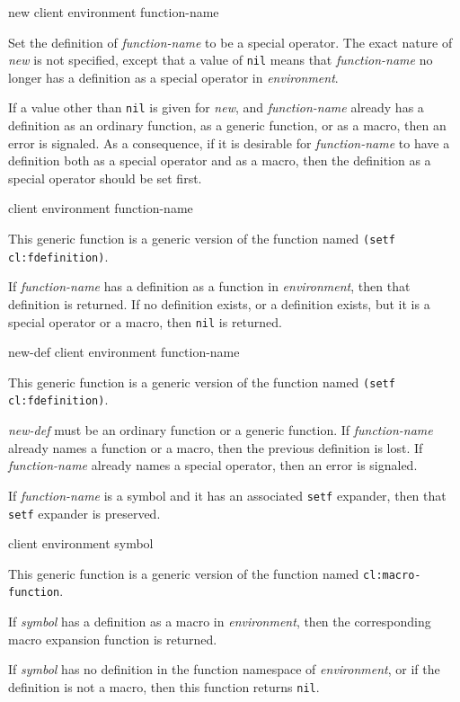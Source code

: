  {new client environment function-name}

Set the definition of \textit{function-name} to be a special operator.
The exact nature of \textit{new} is not specified, except that a
value of \texttt{nil} means that \textit{function-name} no longer has
a definition as a special operator in \textit{environment}.

If a value other than \texttt{nil} is given for \textit{new}, and
\textit{function-name} already has a definition as an ordinary
function, as a generic function, or as a macro, then an error is
signaled.  As a consequence, if it is desirable for
\textit{function-name} to have a definition both as a special operator
and as a macro, then the definition as a special operator should be
set first.

 {client environment function-name}

This generic function is a generic version of the \commonlisp{}
function named \texttt{(setf cl:fdefinition)}.

If \textit{function-name} has a definition as a function in
\textit{environment}, then that definition is returned.  If no
definition exists, or a definition exists, but it is a special
operator or a macro, then \texttt{nil} is returned.

 {new-def client environment function-name}

This generic function is a generic version of the \commonlisp{}
function named \texttt{(setf cl:fdefinition)}.

\textit{new-def} must be an ordinary function or a generic function.
If \textit{function-name} already names a function or a macro, then
the previous definition is lost.  If \textit{function-name} already
names a special operator, then an error is signaled.

If \textit{function-name} is a symbol and it has an associated \texttt{setf}
expander, then that \texttt{setf} expander is preserved.

 {client environment symbol}

This generic function is a generic version of the \commonlisp{}
function named \texttt{cl:macro-function}.

If \textit{symbol} has a definition as a macro in
\textit{environment}, then the corresponding macro expansion function
is returned.

If \textit{symbol} has no definition in the function namespace of
\textit{environment}, or if the definition is not a macro, then this
function returns \texttt{nil}.

